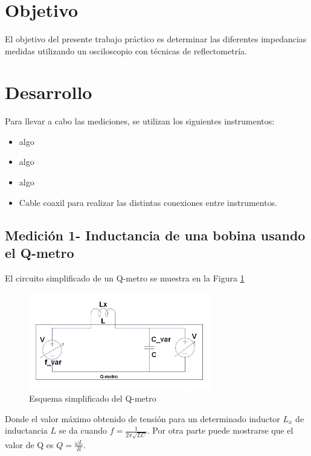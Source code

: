 \documentclass[a4paper,10pt]{article}
\title{  }
\begin{document}
	\maketitle %
	\newpage

	\tableofcontents %
	\newpage


	\section{Objetivo}
	
	\indent	El objetivo del presente trabajo práctico es determinar las 
	diferentes impedancias medidas utilizando un osciloscopio con técnicas de 
	reflectometría.
	
	\newpage
	\section{Desarrollo}
\indent Para llevar a cabo las mediciones, se utilizan los siguientes
		instrumentos:
		\begin{itemize}
			\item algo
			\item algo
			\item algo
			\item Cable coaxil para realizar las distintas conexiones entre 
			instrumentos.
		\end{itemize}	
	
		\subsection{Medici\'on 1- Inductancia de una bobina usando el Q-metro}
		El circuito simplificado de un Q-metro se muestra en la Figura \ref{img001}

			\begin{figure}[!htb]
				\centering
				\includegraphics[width=8cm]
				{Imagenes/qmetro.png}
				\caption{Esquema simplificado del Q-metro}
				\label{img001} 
			\end{figure}
		Donde el valor m\'aximo obtenido de tensi\'on para un determinado inductor $L_x$ de inductancia $L$ se da cuando $f=\frac{1}{2\pi\sqrt{LC}}$. Por otra parte puede mostrarse que el valor de Q es $Q=\frac{\omega L}{R}$.
		
\end{document}

